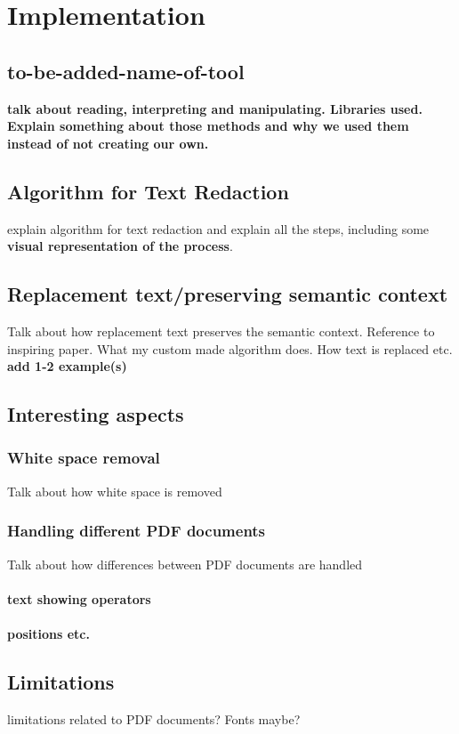 \chapter{Implementation}

\section{to-be-added-name-of-tool}
\textbf{talk about reading, interpreting and manipulating. Libraries used. Explain something about those methods and why we used them instead of not creating our own.}

\section{Algorithm for Text Redaction}
explain algorithm for text redaction and explain all the steps, including some \textbf{visual representation of the process}.

\section{Replacement text/preserving semantic context}
Talk about how replacement text preserves the semantic context. Reference to inspiring paper. What my custom made algorithm does. How text is replaced etc. 
\textbf{add 1-2 example(s)}

\section{Interesting aspects}
    \subsection{White space removal}
        Talk about how white space is removed
    \subsection{Handling different PDF documents}
        Talk about how differences between PDF documents are handled \\\\
        \textbf{text showing operators}\\\\
        \textbf{positions etc.}

\section{Limitations}
limitations related to PDF documents? Fonts maybe? 